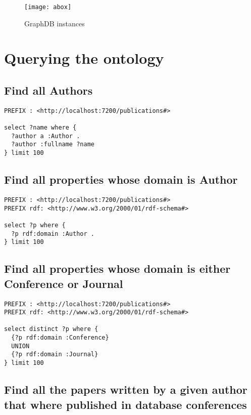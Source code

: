 \documentclass[12pt, a4paper]{article}
\begin{document}
\begin{figure}[H]
  \centering
  \texttt{[image: abox]}
  \caption{GraphDB instances}
  \label{fig:abox}
\end{figure}

\section{Querying the ontology}\label{sec:query}

\subsection{Find all Authors}\label{subsec:query1}

\begin{verbatim}
PREFIX : <http://localhost:7200/publications#>

select ?name where {
  ?author a :Author .
  ?author :fullname ?name
} limit 100
\end{verbatim}

\subsection{Find all properties whose domain is Author}\label{subsec:query2}

\begin{verbatim}
PREFIX : <http://localhost:7200/publications#>
PREFIX rdf: <http://www.w3.org/2000/01/rdf-schema#>

select ?p where {
  ?p rdf:domain :Author .
} limit 100

\end{verbatim}

\subsection{Find all properties whose domain is either Conference or Journal}\label{subsec:query3}

\begin{verbatim}
PREFIX : <http://localhost:7200/publications#>
PREFIX rdf: <http://www.w3.org/2000/01/rdf-schema#>

select distinct ?p where {
  {?p rdf:domain :Conference}
  UNION
  {?p rdf:domain :Journal}
} limit 100
\end{verbatim}

\subsection{Find all the papers written by a given author that where published in database conferences}\label{subsec:query4}
\end{document}
